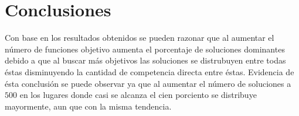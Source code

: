 \documentclass{article}
\begin{document}
\section{Conclusiones}
Con base en los resultados obtenidos se pueden razonar que al aumentar el número de funciones objetivo aumenta el porcentaje de soluciones dominantes debido a que al buscar más objetivos las soluciones se distrubuyen entre todas éstas disminuyendo la cantidad de competencia directa entre éstas. Evidencia de ésta conclusión se puede observar ya que al aumentar el número de soluciones a $500$ en los lugares donde casi se alcanza el cien porciento se distribuye mayormente, aun que con la misma tendencia.


\end{document}
